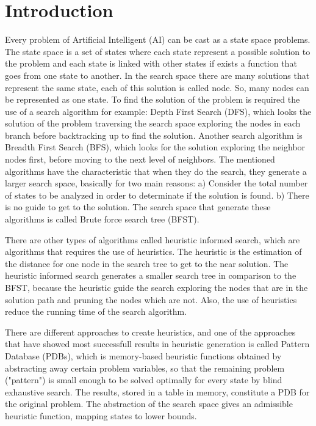 \documentclass[a4paper,12pt]{article}
\begin{document}
\section{Introduction}
Every problem of Artificial Intelligent (AI) can be cast as a state space problems. The state space is a set of states where each state represent a possible solution to the problem and each state is linked with other states if exists a function that goes from one state to another. In the search space there are many solutions that represent the same state, each of this solution is called node. So, many nodes can be represented as one state. To find the solution of the problem is required the use of a search algorithm for example: Depth First Search (DFS), which looks the solution of the problem traversing the search space exploring the nodes in each branch before backtracking up to find the solution. Another search algorithm is Breadth First Search (BFS), which looks for the solution exploring the neighbor nodes first, before moving to the next level of neighbors. The mentioned algorithms have the characteristic that when they do the search, they generate a larger search space, basically for two main reasons: a) Consider the total number of states to be analyzed in order to determinate if the solution is found. b) There is no guide to get to the solution. The search space that generate these algorithms is called Brute force search tree (BFST).

There are other types of algorithms called heuristic informed search, which are algorithms that requires the use of heuristics. The heuristic is the estimation of the distance for one node in the search tree to get to the near solution. The heuristic informed search generates a smaller search tree in comparison to the BFST, because the heuristic guide the search exploring the nodes that are in the solution path and pruning the nodes which are not. Also, the use of heuristics reduce the running time of the search algorithm.

There are different approaches to create heuristics, and one of the approaches that have showed most successfull results in heuristic generation is called Pattern Database (PDBs), which is memory-based heuristic functions obtained by abstracting away certain problem variables, so that the remaining problem ("pattern") is small enough to be solved optimally for every state by blind exhaustive search. The results, stored in a table in memory, constitute a PDB for the original problem. The abstraction of the search space gives an admissible heuristic function, mapping states to lower bounds.
\end{document}
